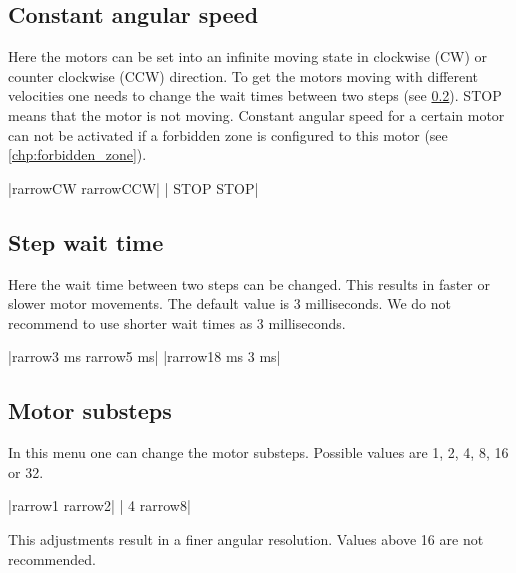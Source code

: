 \subsection{Constant angular speed}
Here the motors can be set into an infinite moving state in clockwise
(CW) or counter clockwise (CCW) direction. To get the motors moving
with different velocities one needs to change the wait times between
two steps (see \ref{menu_step_wait_time}).
STOP means that the motor is not moving. Constant angular speed for a
certain motor can not be activated if a forbidden zone is configured to
this motor (see \ref{chp:forbidden_zone}).
\begin{center}
  |{rarrow}CW     {rarrow}CCW|
             | STOP    STOP|
\end{center}


\subsection{Step wait time}
\label{menu_step_wait_time}
Here the wait time between two steps can be changed. This results in
faster or slower motor movements. The default value is 3 milliseconds.
We do not recommend to use shorter wait times as 3 milliseconds.
\begin{center}
  |{rarrow}3 ms   {rarrow}5 ms|
             |{rarrow}18 ms   3 ms|
\end{center}


\subsection{Motor substeps}
In this menu one can change the motor substeps. Possible values are 1,
2, 4, 8, 16 or 32.
\begin{center}
  |{rarrow}1      {rarrow}2|
             | 4      {rarrow}8|
\end{center}
This adjustments result in a finer angular resolution. Values above
16 are not recommended.


